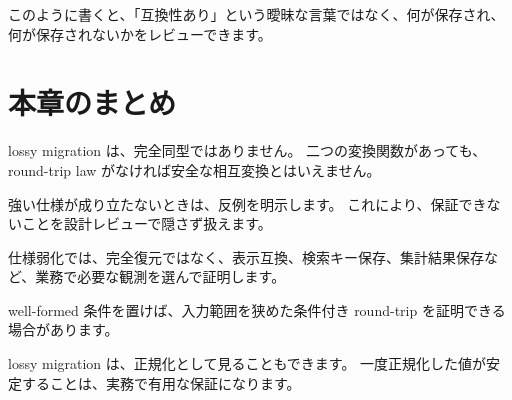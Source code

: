 このように書くと、「互換性あり」という曖昧な言葉ではなく、何が保存され、何が保存されないかをレビューできます。

\section{本章のまとめ}

lossy migration は、完全同型ではありません。
二つの変換関数があっても、round-trip law がなければ安全な相互変換とはいえません。

強い仕様が成り立たないときは、反例を明示します。
これにより、保証できないことを設計レビューで隠さず扱えます。

仕様弱化では、完全復元ではなく、表示互換、検索キー保存、集計結果保存など、業務で必要な観測を選んで証明します。

well-formed 条件を置けば、入力範囲を狭めた条件付き round-trip を証明できる場合があります。

lossy migration は、正規化として見ることもできます。
一度正規化した値が安定することは、実務で有用な保証になります。

